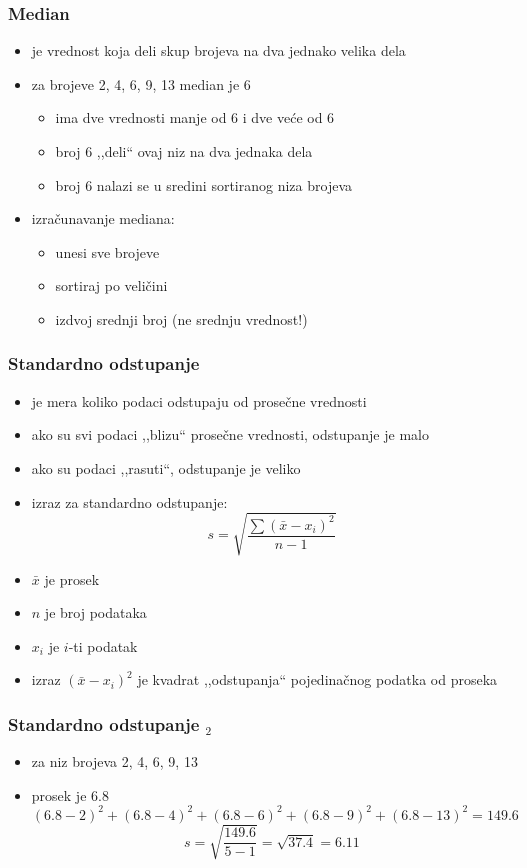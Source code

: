 \documentclass[utf8,compress]{beamer}
\begin{document}
\begin{frame}[fragile]
  \frametitle{Median}
  \begin{itemize}
    \item {} je vrednost koja deli skup brojeva na dva jednako velika dela
    \item za brojeve 2, 4, 6, 9, 13 median je 6
    \begin{itemize}
      \item ima dve vrednosti manje od 6 i dve veće od 6
      \item broj 6 ,,deli`` ovaj niz na dva jednaka dela
      \item broj 6 nalazi se u sredini sortiranog niza brojeva
    \end{itemize}
    \item izračunavanje mediana:
    \begin{itemize}
      \item unesi sve brojeve
      \item sortiraj po veličini
      \item izdvoj srednji broj (ne srednju vrednost!)
    \end{itemize}
  \end{itemize}
\end{frame}

\begin{frame}[fragile]
  \frametitle{Standardno odstupanje}
  \begin{itemize}
    \item {} je mera koliko podaci odstupaju od prosečne vrednosti
    \item ako su svi podaci ,,blizu`` prosečne vrednosti, odstupanje je malo
    \item ako su podaci ,,rasuti``, odstupanje je veliko
    \item izraz za standardno odstupanje: \\
    $$ s = \sqrt{\frac{\sum{(\bar{x}-x_i)^2}}{n-1}} $$
    \item $\bar{x}$ je prosek
    \item $n$ je broj podataka
    \item $x_i$ je $i$-ti podatak
    \item izraz $(\bar{x} - x_i)^2$ je kvadrat ,,odstupanja`` pojedinačnog podatka od proseka
  \end{itemize}
\end{frame}

\begin{frame}[fragile]
  \frametitle{Standardno odstupanje $_2$}
  \begin{itemize}
    \item za niz brojeva 2, 4, 6, 9, 13
    \item prosek je 6.8 \\
    $$(6.8-2)^2 + (6.8-4)^2 + (6.8-6)^2 + (6.8-9)^2 + (6.8-13)^2 = 149.6$$
    $$s = \sqrt{\frac{149.6}{5-1}} = \sqrt{37.4} = 6.11$$
  \end{itemize}
\end{frame}
\end{document}
